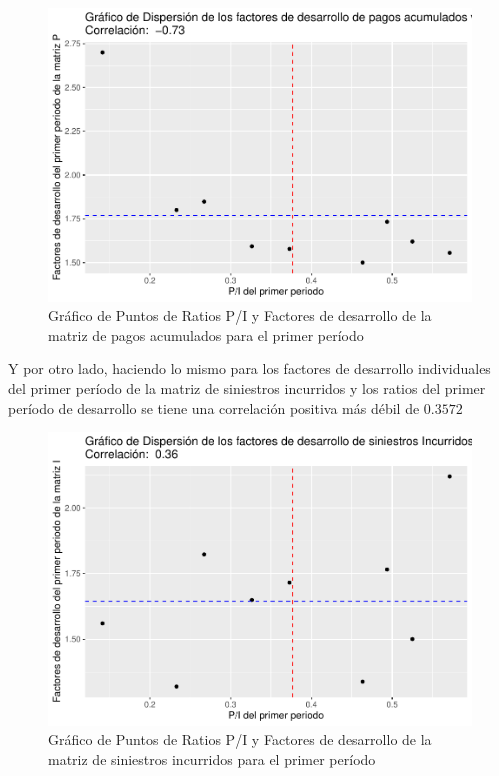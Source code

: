 \documentclass[
  12pt,
]{article}
\begin{document}
\begin{figure}

{\centering \includegraphics[width=0.8\linewidth]{informe_files/figure-latex/unnamed-chunk-25-1} 

}

\caption{\label{reg1_1} Gráfico de Puntos de Ratios P/I y Factores de desarrollo de la matriz de pagos acumulados para el primer período}\label{fig:unnamed-chunk-25}
\end{figure}

Y por otro lado, haciendo lo mismo para los factores de desarrollo
individuales del primer período de la matriz de siniestros incurridos y
los ratios del primer período de desarrollo se tiene una correlación
positiva más débil de \(0.3572\)

\begin{figure}

{\centering \includegraphics[width=0.8\linewidth]{informe_files/figure-latex/unnamed-chunk-27-1} 

}

\caption{\label{reg2_2} Gráfico de Puntos de Ratios P/I y Factores de desarrollo de la matriz de siniestros incurridos para el primer período}\label{fig:unnamed-chunk-27}
\end{figure}
\end{document}
